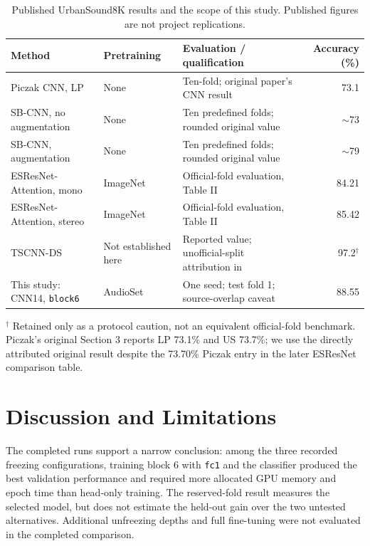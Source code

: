 \documentclass[conference]{IEEEtran}
\newcommand{\code}[1]{\texttt{#1}}
\begin{document}
\begin{table}[t]
\centering\caption{Published UrbanSound8K results and the scope of this study. Published figures are not project replications.}\label{tab:published}
\footnotesize\setlength{\tabcolsep}{4pt}
\begin{tabular}{@{}p{}p{}p{}r@{}}\toprule
Method & Pretraining & Evaluation / qualification & Accuracy (\%)\\\midrule
Piczak CNN, LP \cite{piczak2015cnn} & None & Ten-fold; original paper's CNN result & 73.1\\
SB-CNN, no augmentation \cite{salamon2017augmentation} & None & Ten predefined folds; rounded original value & $\sim$73\\
SB-CNN, augmentation \cite{salamon2017augmentation} & None & Ten predefined folds; rounded original value & $\sim$79\\
ESResNet-Attention, mono \cite{guzhov2020esresnet} & ImageNet & Official-fold evaluation, Table II & 84.21\\
ESResNet-Attention, stereo \cite{guzhov2020esresnet} & ImageNet & Official-fold evaluation, Table II & 85.42\\
TSCNN-DS \cite{su2019fusion} & Not established here & Reported value; unofficial-split attribution in \cite{guzhov2020esresnet} & 97.2$^\dagger$\\\midrule
This study: CNN14, \code{block6} & AudioSet & One seed; test fold 1; source-overlap caveat & 88.55\\\bottomrule
\end{tabular}
\vspace{1mm}\parbox{.96\textwidth}{\scriptsize $^\dagger$ Retained only as a protocol caution, not an equivalent official-fold benchmark. Piczak's original Section 3 reports LP 73.1\% and US 73.7\%; we use the directly attributed original result despite the 73.70\% Piczak entry in the later ESResNet comparison table.}
\end{table}

\section{Discussion and Limitations}\label{sec:discussion}
The completed runs support a narrow conclusion: among the three recorded freezing configurations, training block 6 with \code{fc1} and the classifier produced the best validation performance and required more allocated GPU memory and epoch time than head-only training. The reserved-fold result measures the selected model, but does not estimate the held-out gain over the two untested alternatives. Additional unfreezing depths and full fine-tuning were not evaluated in the completed comparison.
\end{document}
